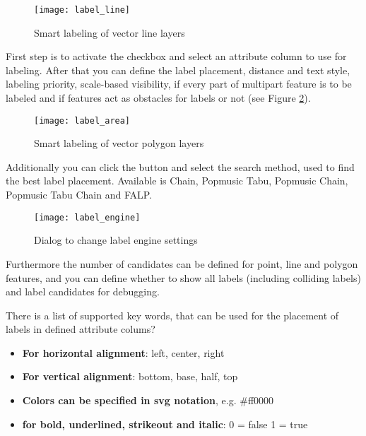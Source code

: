 \begin{figure}[ht]
\centering
   \texttt{[image: label\_line]}
   \caption{Smart labeling of vector line layers \nixcaption}\label{fig:linelabel}
\end{figure}


First step is to activate the  checkbox and select an attribute
column to use for labeling. After that you can define the label placement, distance and text
style, labeling priority, scale-based visibility, if every part of multipart feature is to be
labeled and if features act as obstacles for labels or not (see Figure \ref{fig:arealabel}).

\begin{figure}[ht]
\centering
   \texttt{[image: label\_area]}
   \caption{Smart labeling of vector polygon layers \nixcaption}\label{fig:arealabel}
\end{figure}


Additionally you can click the  button and select the search method,
used to find the best label placement. Available is Chain, Popmusic Tabu, Popmusic Chain,
Popmusic Tabu Chain and FALP.

\begin{figure}[ht]
\centering
   \texttt{[image: label\_engine]}
   \caption{Dialog to change label engine settings \nixcaption}\label{fig:labelengine}
\end{figure}

Furthermore the number of candidates can be defined for point, line and polygon features,
and you can define whether to show all labels (including colliding labels) and label
candidates for debugging.


There is a list of supported key words, that can be used for the placement of labels in defined attribute colums?

\begin{itemize}[label=--]
\item \textbf{For horizontal alignment}: left, center, right
\item \textbf{For vertical alignment}: bottom, base, half, top
\item \textbf{Colors can be specified in svg notation}, e.g. \#ff0000
\item \textbf{for bold, underlined, strikeout and italic}: 0 = false 1 = true
\end{itemize}

